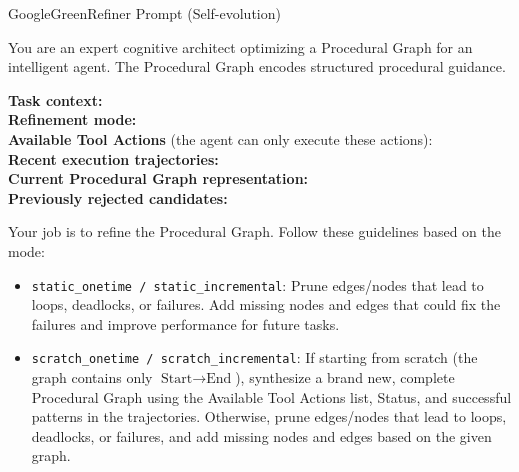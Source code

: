\begin{tracebox}{GoogleGreen}{Refiner Prompt (Self-evolution)}
\footnotesize\raggedright
You are an expert cognitive architect optimizing a Procedural Graph for an intelligent agent. The Procedural Graph encodes structured procedural guidance.

\smallskip
\textbf{Task context:} \\
\textbf{Refinement mode:} \\
\textbf{Available Tool Actions} (the agent can only execute these actions): \\
\textbf{Recent execution trajectories:} \\
\textbf{Current Procedural Graph representation:} \\
\textbf{Previously rejected candidates:} 

\medskip
Your job is to refine the Procedural Graph. Follow these guidelines based on the mode:
\begin{itemize}[leftmargin=12pt, itemsep=1pt, topsep=2pt]
    \item \texttt{static\_onetime / static\_incremental}: Prune edges/nodes that lead to loops, deadlocks, or failures. Add missing nodes and edges that could fix the failures and improve performance for future tasks.
    \item \texttt{scratch\_onetime / scratch\_incremental}: If starting from scratch (the graph contains only $\text{Start} \rightarrow \text{End}$), synthesize a brand new, complete Procedural Graph using the Available Tool Actions list, Status, and successful patterns in the trajectories. Otherwise, prune edges/nodes that lead to loops, deadlocks, or failures, and add missing nodes and edges based on the given graph.
\end{itemize}


\end{tracebox}
